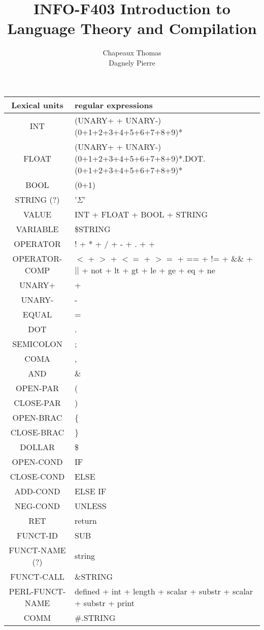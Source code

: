 \documentclass[a4paper,10pt]{article}
\title{INFO-F403 Introduction to Language Theory and Compilation}
\author{Chapeaux Thomas\\Dagnely Pierre}
\begin{document}
\maketitle


\pagebreak

\hspace{-2.5cm}\begin{tabular}{|c|l|}
\hline
Lexical units  		& regular expressions \\ \hline
INT					& (UNARY+ + UNARY-)(0+1+2+3+4+5+6+7+8+9)* \\ \hline
FLOAT				& (UNARY+ + UNARY-)(0+1+2+3+4+5+6+7+8+9)*.DOT.(0+1+2+3+4+5+6+7+8+9)* \\ \hline
BOOL				& (0+1) \\ \hline
STRING (?)			& '$\Sigma$'  \\ \hline
VALUE				& INT + FLOAT + BOOL + STRING \\ \hline
VARIABLE			& \$STRING \\ \hline
OPERATOR			& ! + * + / + - + . $+$ + \\ \hline
OPERATOR-COMP		& $<$ + $>$ + $<=$ + $>=$ + == + != + \&\& + $||$ + not + lt + gt + le + ge + eq + ne \\ \hline
UNARY+				& + \\ \hline
UNARY-				& - \\ \hline
EQUAL				& = \\ \hline
DOT					& . \\ \hline
SEMICOLON			& ; \\ \hline
COMA				& , \\ \hline
AND					& \& \\ \hline
OPEN-PAR			& ( \\ \hline
CLOSE-PAR			& ) \\ \hline
OPEN-BRAC			& \{ \\ \hline
CLOSE-BRAC			& \} \\ \hline
DOLLAR				& \$ \\ \hline
OPEN-COND			& IF \\ \hline
CLOSE-COND 			& ELSE \\ \hline
ADD-COND			& ELSE IF \\ \hline
NEG-COND			& UNLESS \\ \hline
RET					& return \\ \hline
FUNCT-ID			& SUB \\ \hline
FUNCT-NAME (?)		& string \\ \hline 
FUNCT-CALL			& \&STRING \\ \hline
PERL-FUNCT-NAME		& defined + int + length + scalar + substr + scalar + substr + print\\ \hline
COMM				& \#.STRING \\ \hline


\end{tabular}
\end{document}
